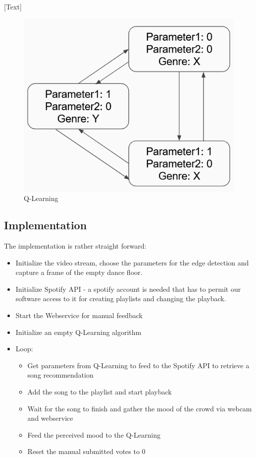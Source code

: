 \documentclass{article}
\begin{document}
[Text]

\begin{figure}[ht!]
\centering
\includegraphics[scale=0.5]{QLearning.png}
\caption{Q-Learning}
\label{fig:q-learning}
\end{figure}

\subsection{Implementation}

The implementation is rather straight forward:
\begin{itemize}
    \item Initialize the video stream, choose the parameters for the edge detection and capture a frame of the empty dance floor.
    \item Initialize Spotify API - a spotify account is needed that has to permit our software access to it for creating playlists and changing the playback.
    \item Start the Webservice for manual feedback
    \item Initialize an empty Q-Learning algorithm
    \item Loop:
    \begin{itemize}
        \item Get parameters from Q-Learning to feed to the Spotify API to retrieve a song recommendation
        \item Add the song to the playlist and start playback
        \item Wait for the song to finish and gather the mood of the crowd via webcam and webservice
        \item Feed the perceived mood to the Q-Learning
        \item Reset the manual submitted votes to 0
    \end{itemize}
\end{itemize}
\end{document}
